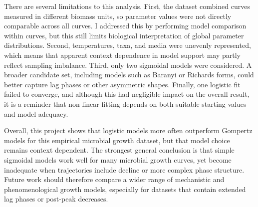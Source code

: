 \documentclass[11pt]{article}
\begin{document}
There are several limitations to this analysis. First, the dataset combined curves measured in different biomass units, so parameter values were not directly comparable across all curves. I addressed this by performing model comparison within curves, but this still limits biological interpretation of global parameter distributions. Second, temperatures, taxa, and media were unevenly represented, which means that apparent context dependence in model support may partly reflect sampling imbalance. Third, only two sigmoidal models were considered. A broader candidate set, including models such as Baranyi or Richards forms, could better capture lag phases or other asymmetric shapes. Finally, one logistic fit failed to converge, and although this had negligible impact on the overall result, it is a reminder that non-linear fitting depends on both suitable starting values and model adequacy.

Overall, this project shows that logistic models more often outperform Gompertz models for this empirical microbial growth dataset, but that model choice remains context dependent. The strongest general conclusion is that simple sigmoidal models work well for many microbial growth curves, yet become inadequate when trajectories include decline or more complex phase structure. Future work should therefore compare a wider range of mechanistic and phenomenological growth models, especially for datasets that contain extended lag phases or post-peak decreases.


\end{document}
